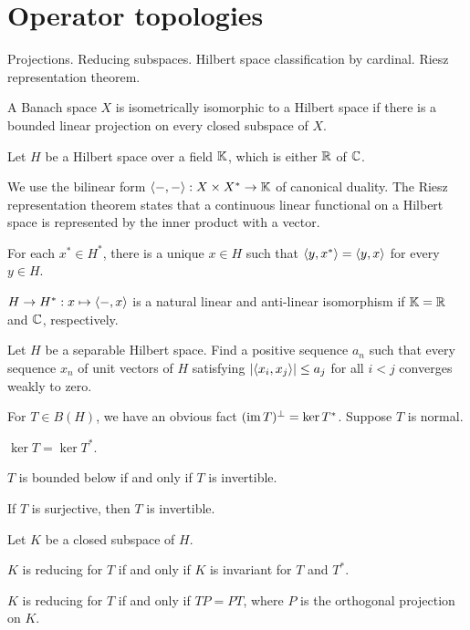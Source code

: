 \documentclass{../../large}
\begin{document}
\section{Operator topologies}
Projections. Reducing subspaces.
Hilbert space classification by cardinal.
Riesz representation theorem.
\begin{prb}
\begin{parts}
\item A Banach space $X$ is isometrically isomorphic to a Hilbert space if there is a bounded linear projection on every closed subspace of $X$.
\end{parts}
\end{prb}

\begin{prb}
Let $H$ be a Hilbert space over a field $\mathbb{K}$, which is either $\mathbb{R}$ of $\mathbb{C}$.


We use the bilinear form $\langle-,-\rangle:X\times X^*\to\mathbb{K}$ of canonical duality.
The Riesz representation theorem states that a continuous linear functional on a Hilbert space is represented by the inner product with a vector.
\begin{parts}
\item For each $x^*\in H^*$, there is a unique $x\in H$ such that $\langle y,x^*\rangle=\langle y,x\rangle$ for every $y\in H$.
\item $H\to H^*:x\mapsto\langle-,x\rangle$ is a natural linear and anti-linear isomorphism if $\mathbb{K}=\mathbb{R}$ and $\mathbb{C}$, respectively.
\end{parts}
\end{prb}



Let $H$ be a separable Hilbert space.
Find a positive sequence $a_n$ such that every sequence $x_n$ of unit vectors of $H$ satisfying $|\langle x_i,x_j\rangle|\le a_j$ for all $i<j$ converges weakly to zero.



\begin{prb}
For $T\in B(H)$, we have an obvious fact $(\operatorname{im} T)^\perp=\ker T^*$.
Suppose $T$ is normal.
\begin{parts}
\item $\ker T=\ker T^*$.
\item $T$ is bounded below if and only if $T$ is invertible.
\item If $T$ is surjective, then $T$ is invertible.
\end{parts}
\end{prb}

\begin{prb}
Let $K$ be a closed subspace of $H$.
\begin{parts}
\item $K$ is reducing for $T$ if and only if $K$ is invariant for $T$ and $T^*$.
\item $K$ is reducing for $T$ if and only if $TP=PT$, where $P$ is the orthogonal projection on $K$.
\end{parts}
\end{prb}
\end{document}
